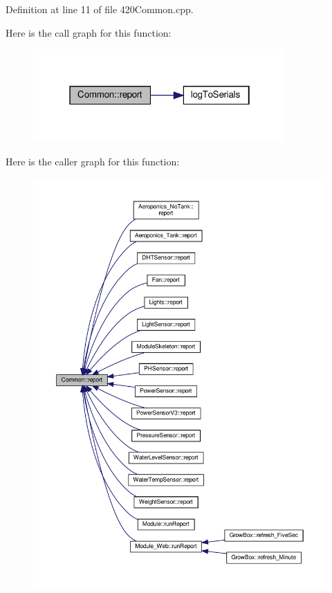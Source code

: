 Definition at line 11 of file 420\+Common.\+cpp.

Here is the call graph for this function\+:
\nopagebreak
\begin{figure}[H]
\begin{center}
\leavevmode
\includegraphics[width=274pt]{class_common_a9e60e2c26a5f4d72342a59a969954636_cgraph}
\end{center}
\end{figure}
Here is the caller graph for this function\+:
\nopagebreak
\begin{figure}[H]
\begin{center}
\leavevmode
\includegraphics[width=350pt]{class_common_a9e60e2c26a5f4d72342a59a969954636_icgraph}
\end{center}
\end{figure}


